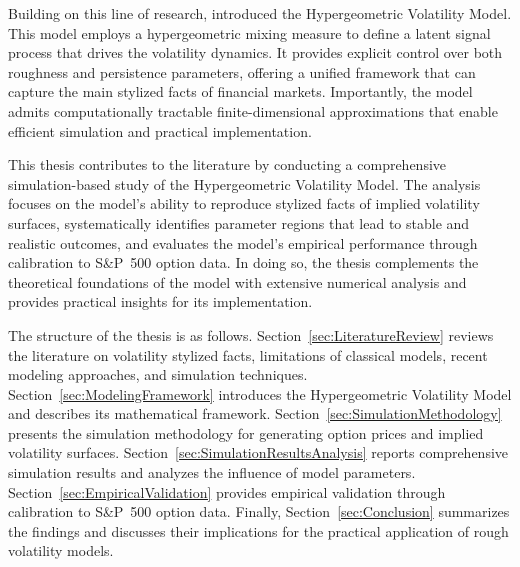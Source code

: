Building on this line of research, \cite{Damian2021} introduced the Hypergeometric Volatility Model. This model employs a hypergeometric mixing measure to define a latent signal process that drives the volatility dynamics. It provides explicit control over both roughness and persistence parameters, offering a unified framework that can capture the main stylized facts of financial markets. Importantly, the model admits computationally tractable finite-dimensional approximations that enable efficient simulation and practical implementation.

This thesis contributes to the literature by conducting a comprehensive simulation-based study of the Hypergeometric Volatility Model. The analysis focuses on the model's ability to reproduce stylized facts of implied volatility surfaces, systematically identifies parameter regions that lead to stable and realistic outcomes, and evaluates the model's empirical performance through calibration to S\&P~500 option data. In doing so, the thesis complements the theoretical foundations of the model with extensive numerical analysis and provides practical insights for its implementation.

The structure of the thesis is as follows. Section~\ref{sec:LiteratureReview} reviews the literature on volatility stylized facts, limitations of classical models, recent modeling approaches, and simulation techniques. Section~\ref{sec:ModelingFramework} introduces the Hypergeometric Volatility Model and describes its mathematical framework. Section~\ref{sec:SimulationMethodology} presents the simulation methodology for generating option prices and implied volatility surfaces. Section~\ref{sec:SimulationResultsAnalysis} reports comprehensive simulation results and analyzes the influence of model parameters. Section~\ref{sec:EmpiricalValidation} provides empirical validation through calibration to S\&P~500 option data. Finally, Section~\ref{sec:Conclusion} summarizes the findings and discusses their implications for the practical application of rough volatility models.
